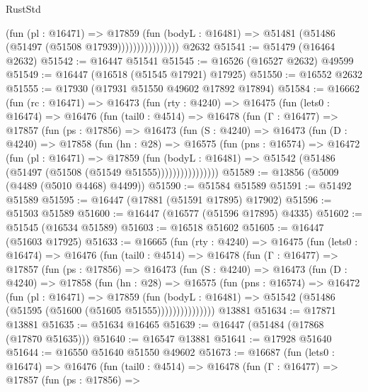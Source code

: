 \begin{lexlean}{RustStd}
\begin{coremodule}
{\begin{coremodule}
{{{{{{{{{{{{{{{{{{{{{{{{{{{{{{{{{{{{{{{{{{{{{{{{{{{{{{{                          (fun (pl : @16471) =>
                          @17859
                            (fun (bodyL : @16481) =>
                            @51481 (@51486 (@51497 (@51508 @17939))))))))))))))))
    @2632
@51541 := @51479 (@16464 @2632)
@51542 := @16447 @51541
@51545 := @16526 (@16527 @2632) @49599
@51549 := @16447 (@16518 (@51545 @17921) @17925)
@51550 := @16552 @2632
@51555 := @17930 (@17931 @51550 @49602 @17892 @17894)
@51584 := @16662
    (fun (rc : @16471) =>
    @16473
      (fun (rty : @4240) =>
      @16475
        (fun (lets0 : @16474) =>
        @16476
          (fun (tail0 : @4514) =>
          @16478
            (fun (Γ : @16477) =>
            @17857
              (fun (ps : @17856) =>
              @16473
                (fun (S : @4240) =>
                @16473
                  (fun (D : @4240) =>
                  @17858
                    (fun (hn : @28) =>
                    @16575
                      (fun (pns : @16574) =>
                      @16472
                        (fun (pl : @16471) =>
                        @17859
                          (fun (bodyL : @16481) =>
                          @51542 (@51486 (@51497 (@51508 (@51549 @51555))))))))))))))))
@51589 := @13856 (@5009 (@4489 (@5010 @4468) @4499))
@51590 := @51584 @51589
@51591 := @51492 @51589
@51595 := @16447 (@17881 (@51591 @17895) @17902)
@51596 := @51503 @51589
@51600 := @16447 (@16577 (@51596 @17895) @4335)
@51602 := @51545 (@16534 @51589)
@51603 := @16518 @51602
@51605 := @16447 (@51603 @17925)
@51633 := @16665
    (fun (rty : @4240) =>
    @16475
      (fun (lets0 : @16474) =>
      @16476
        (fun (tail0 : @4514) =>
        @16478
          (fun (Γ : @16477) =>
          @17857
            (fun (ps : @17856) =>
            @16473
              (fun (S : @4240) =>
              @16473
                (fun (D : @4240) =>
                @17858
                  (fun (hn : @28) =>
                  @16575
                    (fun (pns : @16574) =>
                    @16472
                      (fun (pl : @16471) =>
                      @17859
                        (fun (bodyL : @16481) =>
                        @51542 (@51486 (@51595 (@51600 (@51605 @51555)))))))))))))))
    @13881
@51634 := @17871 @13881
@51635 := @51634 @16465
@51639 := @16447 (@51484 (@17868 (@17870 @51635)))
@51640 := @16547 @13881
@51641 := @17928 @51640
@51644 := @16550 @51640 @51550 @49602
@51673 := @16687
    (fun (lets0 : @16474) =>
    @16476
      (fun (tail0 : @4514) =>
      @16478
        (fun (Γ : @16477) =>
        @17857
          (fun (ps : @17856) =>
}}}}}}}}}}}}}}}}}}}}}}}}}}}}}}}}}}}}}}}}}}}}}}}}}}}}}}}
\end{coremodule}}
\end{coremodule}
\end{lexlean}
